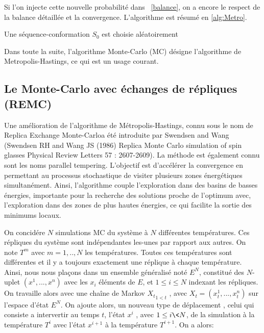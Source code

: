 Si l'on injecte cette nouvelle probabilité dans ~\ref{balance}, on a encore le respect de la balance détaillée et la convergence. L'algorithme est résumé en \ref{alg:Metro}.


\begin{algorithm}
  \label{alg:Metro}
  Une séquence-conformation $S_0$ est choisie aléatoirement\;
  
\end{algorithm}


Dans toute la suite, l'algorithme Monte-Carlo (MC) désigne l'algorithme de Metropolis-Hastings, ce qui est un usage courant.

\subsection{Le Monte-Carlo avec échanges de répliques (REMC)}


Une amélioration de l'algorithme de Métropolis-Hastings, connu sous le nom de \og Replica Exchange Monte-Carlo\fg a été introduite par Swendsen and Wang (Swendsen RH and Wang JS (1986) Replica Monte Carlo simulation of spin glasses Physical Review Letters 57 : 2607-2609). La méthode est également connu sont les noms \og parallel tempering\fg. L'objectif est d'accélérer la convergence en permettant au processus stochastique de visiter plusieurs zones énergétiques simultanément. Ainsi, l'algorithme couple l'exploration dans des basins de basses énergies, importante pour la recherche des solutions proche de l'optimum avec, l'exploration dans des zones de plus hautes énergies, ce qui facilite la sortie des minimums locaux.

On concidére $N$ simulations MC du système à $N$ différentes températures. Ces répliques du système sont indépendantes les-unes par rapport aux autres. On note $T^m$ avec $m=1,..,N$ les températures. Toutes ces températures sont différentes et il y a toujours exactement une réplique à chaque température. Ainsi, nous nous plaçons dans un ensemble généralisé noté $E^N$, constitué des $N$-uplet $(x^1,...,x^n)$ avec les $x_i$ éléments de $E$, et $1 \leq i \leq N$  indexant les répliques. On travaille alors avec une chaîne de Markov ${X_t}_{1<t}$ , avec $X_t=(x^1_t,...,x^n_t)$ sur l'espace d'état $E^N$. On ajoute alors, un nouveau type de déplacement , celui qui consiste a intervertir au temps $t$, l'état $x^i$ , avec $1 \leq i \<  N$, de la simulation à la température $T^i$ avec l'état $x^{i+1}$ à la température $T^{i+1}$. On a alors:

